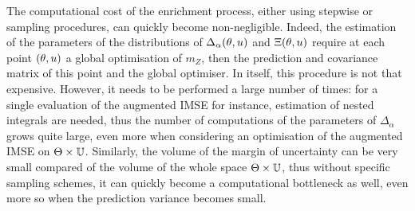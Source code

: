 \documentclass[../../Main_ManuscritThese.tex]{subfiles}
\begin{document}
The computational cost of the enrichment process, either using
stepwise or sampling procedures, can quickly become
non-negligible. Indeed, the estimation of the parameters of the
distributions of $\Delta_{\alpha}(\theta, u)$ and $\Xi(\theta, u)$
require at each point $(\theta, u)$ a global optimisation of $m_Z$,
then the prediction and covariance matrix of this point and the global
optimiser. In itself, this procedure is not that expensive. However,
it needs to be performed a large number of times: for a single
evaluation of the augmented IMSE for instance, estimation of nested
integrals are needed, thus the number of computations of the
parameters of $\Delta_{\alpha}$ grows quite large, even more when
considering an optimisation of the augmented IMSE on
$\Theta \times\mathbb{U}$. Similarly, the volume of the margin of
uncertainty can be very small compared of the volume of the whole
space $\Theta \times \mathbb{U}$, thus without specific sampling
schemes, it can quickly become a computational bottleneck as well,
even more so when the prediction variance becomes small.



\markchapterend


\subfileLocal{
	\pagestyle{empty}
	
	
}
\end{document}
